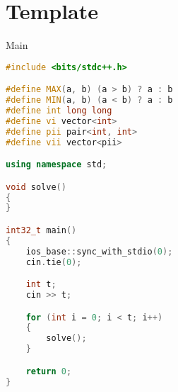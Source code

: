 \documentclass[leter]{amsart}
\begin{document}
\section{Template}
Main
\begin{multicols}{2}
\begin{lstlisting}[language=C++]
#include <bits/stdc++.h>

#define MAX(a, b) (a > b) ? a : b
#define MIN(a, b) (a < b) ? a : b
#define int long long
#define vi vector<int>
#define pii pair<int, int>
#define vii vector<pii>

using namespace std;

void solve()
{
}

int32_t main()
{
    ios_base::sync_with_stdio(0);
    cin.tie(0);

    int t;
    cin >> t;

    for (int i = 0; i < t; i++)
    {
        solve();
    }

    return 0;
}

\end{lstlisting}
\end{multicols}
\end{document}
